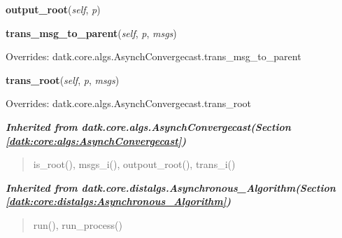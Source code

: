     \vspace{0.5ex}

\hspace{.8\funcindent}\begin{boxedminipage}{\funcwidth}

    \raggedright \textbf{output\_root}(\textit{self}, \textit{p})

\setlength{\parskip}{2ex}
\setlength{\parskip}{1ex}
    \end{boxedminipage}

    \vspace{0.5ex}

\hspace{.8\funcindent}\begin{boxedminipage}{\funcwidth}

    \raggedright \textbf{trans\_msg\_to\_parent}(\textit{self}, \textit{p}, \textit{msgs})

\setlength{\parskip}{2ex}
\setlength{\parskip}{1ex}
      Overrides: datk.core.algs.AsynchConvergecast.trans\_msg\_to\_parent

    \end{boxedminipage}

    \vspace{0.5ex}

\hspace{.8\funcindent}\begin{boxedminipage}{\funcwidth}

    \raggedright \textbf{trans\_root}(\textit{self}, \textit{p}, \textit{msgs})

\setlength{\parskip}{2ex}
\setlength{\parskip}{1ex}
      Overrides: datk.core.algs.AsynchConvergecast.trans\_root

    \end{boxedminipage}


\large{\textbf{\textit{Inherited from datk.core.algs.AsynchConvergecast\textit{(Section \ref{datk:core:algs:AsynchConvergecast})}}}}

\begin{quote}
is\_root(), msgs\_i(), outpout\_root(), trans\_i()
\end{quote}

\large{\textbf{\textit{Inherited from datk.core.distalgs.Asynchronous\_Algorithm\textit{(Section \ref{datk:core:distalgs:Asynchronous_Algorithm})}}}}

\begin{quote}
run(), run\_process()
\end{quote}


